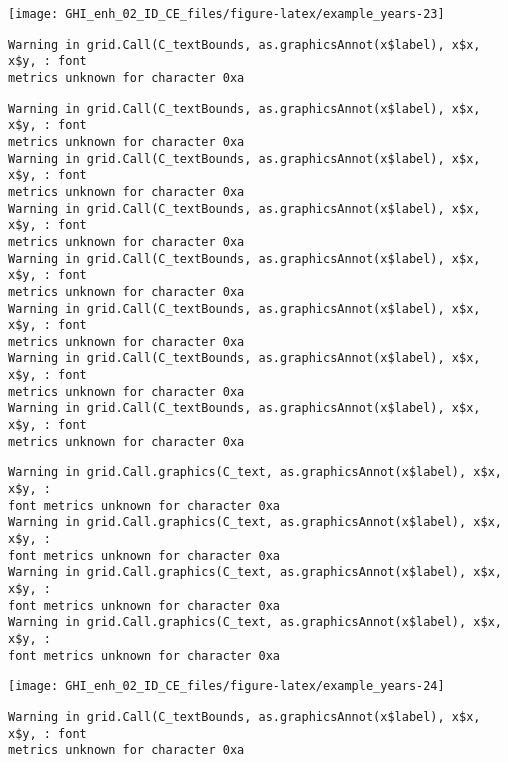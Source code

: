 \documentclass[
  10pt,
  a4paper,oneside]{article}
\begin{document}
\begin{center}\texttt{[image: GHI\_enh\_02\_ID\_CE\_files/figure-latex/example\_years-23]} \end{center}

\begin{verbatim}
Warning in grid.Call(C_textBounds, as.graphicsAnnot(x$label), x$x, x$y, : font
metrics unknown for character 0xa
\end{verbatim}

\begin{verbatim}
Warning in grid.Call(C_textBounds, as.graphicsAnnot(x$label), x$x, x$y, : font
metrics unknown for character 0xa
Warning in grid.Call(C_textBounds, as.graphicsAnnot(x$label), x$x, x$y, : font
metrics unknown for character 0xa
Warning in grid.Call(C_textBounds, as.graphicsAnnot(x$label), x$x, x$y, : font
metrics unknown for character 0xa
Warning in grid.Call(C_textBounds, as.graphicsAnnot(x$label), x$x, x$y, : font
metrics unknown for character 0xa
Warning in grid.Call(C_textBounds, as.graphicsAnnot(x$label), x$x, x$y, : font
metrics unknown for character 0xa
Warning in grid.Call(C_textBounds, as.graphicsAnnot(x$label), x$x, x$y, : font
metrics unknown for character 0xa
Warning in grid.Call(C_textBounds, as.graphicsAnnot(x$label), x$x, x$y, : font
metrics unknown for character 0xa
\end{verbatim}

\begin{verbatim}
Warning in grid.Call.graphics(C_text, as.graphicsAnnot(x$label), x$x, x$y, :
font metrics unknown for character 0xa
Warning in grid.Call.graphics(C_text, as.graphicsAnnot(x$label), x$x, x$y, :
font metrics unknown for character 0xa
Warning in grid.Call.graphics(C_text, as.graphicsAnnot(x$label), x$x, x$y, :
font metrics unknown for character 0xa
Warning in grid.Call.graphics(C_text, as.graphicsAnnot(x$label), x$x, x$y, :
font metrics unknown for character 0xa
\end{verbatim}

\begin{center}\texttt{[image: GHI\_enh\_02\_ID\_CE\_files/figure-latex/example\_years-24]} \end{center}

\begin{verbatim}
Warning in grid.Call(C_textBounds, as.graphicsAnnot(x$label), x$x, x$y, : font
metrics unknown for character 0xa
\end{verbatim}
\end{document}
